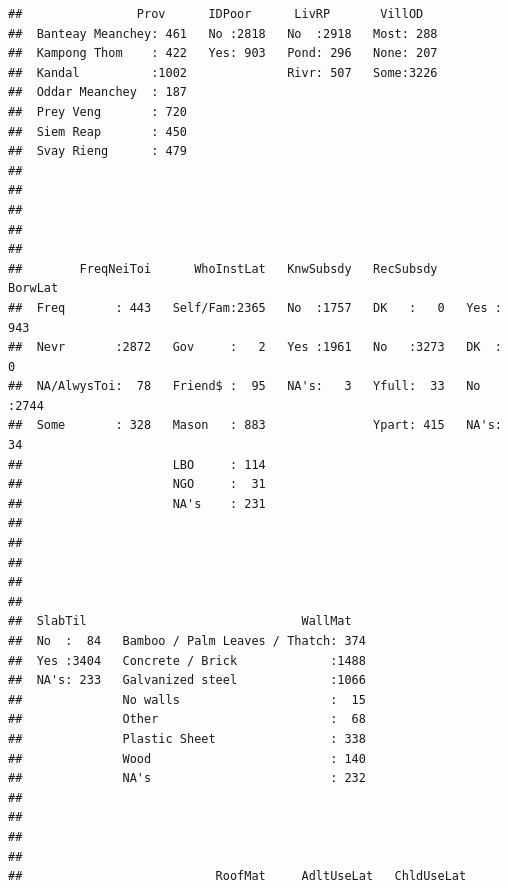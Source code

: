 \documentclass[11pt,]{article}
\begin{document}
\begin{verbatim}
##                Prov      IDPoor      LivRP       VillOD    
##  Banteay Meanchey: 461   No :2818   No  :2918   Most: 288  
##  Kampong Thom    : 422   Yes: 903   Pond: 296   None: 207  
##  Kandal          :1002              Rivr: 507   Some:3226  
##  Oddar Meanchey  : 187                                     
##  Prey Veng       : 720                                     
##  Siem Reap       : 450                                     
##  Svay Rieng      : 479                                     
##                                                            
##                                                            
##                                                            
##                                                            
##                                                            
##        FreqNeiToi      WhoInstLat   KnwSubsdy   RecSubsdy    BorwLat    
##  Freq       : 443   Self/Fam:2365   No  :1757   DK   :   0   Yes : 943  
##  Nevr       :2872   Gov     :   2   Yes :1961   No   :3273   DK  :   0  
##  NA/AlwysToi:  78   Friend$ :  95   NA's:   3   Yfull:  33   No  :2744  
##  Some       : 328   Mason   : 883               Ypart: 415   NA's:  34  
##                     LBO     : 114                                       
##                     NGO     :  31                                       
##                     NA's    : 231                                       
##                                                                         
##                                                                         
##                                                                         
##                                                                         
##                                                                         
##  SlabTil                              WallMat    
##  No  :  84   Bamboo / Palm Leaves / Thatch: 374  
##  Yes :3404   Concrete / Brick             :1488  
##  NA's: 233   Galvanized steel             :1066  
##              No walls                     :  15  
##              Other                        :  68  
##              Plastic Sheet                : 338  
##              Wood                         : 140  
##              NA's                         : 232  
##                                                  
##                                                  
##                                                  
##                                                  
##                           RoofMat     AdltUseLat   ChldUseLat  

\end{verbatim}
\end{document}
